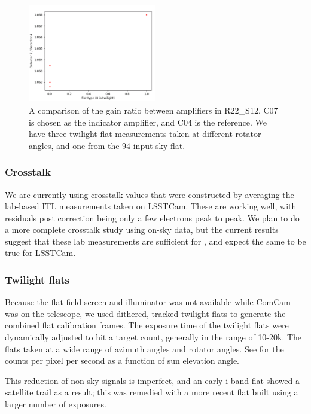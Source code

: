 \begin{figure}
  \begin{center}
  \includegraphics[width=0.5\textwidth]{figures/isr-f05-gain_ratios_by_flat.png}
  \caption{A comparison of the gain ratio between amplifiers in R22\_S12.  C07 is chosen as the indicator amplifier, and C04 is the reference.  We have three twilight flat measurements taken at different rotator angles, and one from the 94 input sky flat.}
  \label{fig:amp_gain_ratios}
  \end{center}
\end{figure}

\subsubsection{Crosstalk}

We are currently using crosstalk values that were constructed by averaging the lab-based ITL measurements taken on LSSTCam.
These are working well, with residuals post correction being only a few electrons peak to peak.
We plan to do a more complete crosstalk study using on-sky data, but the current results suggest that these lab measurements are sufficient for \ComCam, and expect the same to be true for LSSTCam.

\subsubsection{Twilight flats}

Because the flat field screen and illuminator was not available while ComCam was on the telescope, we used dithered, tracked twilight flats to generate the combined flat calibration frames. The exposure time of the twilight flats were dynamically adjusted to hit a target count, generally in the range of 10-20k. The flats taken at a wide range of azimuth angles and rotator angles. See  for the counts per pixel per second as a function of sun elevation angle.

This reduction of non-sky signals is imperfect, and an early i-band flat showed a satellite trail as a
result; this was remedied with a more recent flat built using a larger number of exposures.


